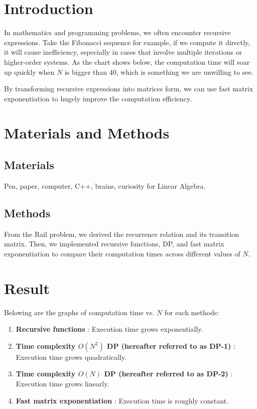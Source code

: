 \section{Introduction}
\label{introduction}

In mathematics and programming problems, we often encounter recursive expressions.
Take the Fibonacci sequence for example, if we compute it directly, it will cause inefficiency, especially in cases that involve multiple iterations or higher-order systems.
As the chart shows below, the computation time will soar up quickly when $N$ is bigger than $40$, which is something we are unwilling to see.

By transforming recursive expressions into matrices form, we can use fast matrix exponentiation to hugely improve the computation efficiency.

\section{Materials and Methods}
\label{materials & methods}
\subsection{Materials}

Pen, paper, computer, C++, brains, curiosity for Linear Algebra.

\subsection{Methods}

From the Rail problem, we derived the recurrence relation and its transition matrix.
Then, we implemented recursive functions, DP, and fast matrix exponentiation to compare their computation times across different values of $N$.

\section{Result}

Belowing are the graphs of computation time vs. $N$ for each methods:
\begin{enumerate}
    \item \textbf{Recursive functions} : Execution time grows exponentially.
    \item \textbf{Time complexity $O(N^2)$ DP (hereafter referred to as DP-1)} : Execution time grows quadratically.
    \item \textbf{Time complexity $O(N)$ DP (hereafter referred to as DP-2)} : Execution time grows linearly.
    \item \textbf{Fast matrix exponentiation} : Execution time is roughly constant.
\end{enumerate}

